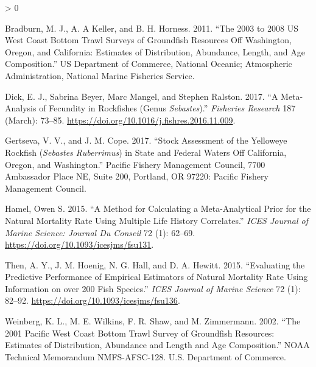 \documentclass[11pt,
  english,
  a4paper,
]{article}
\newlength{\cslhangindent}
\newenvironment{CSLReferences}[2] %
 {%
  \setlength{\parindent}{0pt}
  \ifodd #1 \everypar{\setlength{\hangindent}{\cslhangindent}}\ignorespaces\fi
  \ifnum #2 > 0
  \setlength{\parskip}{#2\baselineskip}
  \fi
 }%
 {}
\begin{document}
\hypertarget{refs}{}
\begin{CSLReferences}{1}{0}
\leavevmode\hypertarget{ref-bradburn_2003_2011}{}%
Bradburn, M. J., A. A Keller, and B. H. Horness. 2011. {``The 2003 to 2008 {US} {West} {Coast} Bottom Trawl Surveys of Groundfish Resources Off {Washington}, {Oregon}, and {California}: Estimates of Distribution, Abundance, Length, and Age Composition.''} US Department of Commerce, National Oceanic; Atmospheric Administration, National Marine Fisheries Service.

\leavevmode\hypertarget{ref-dick_meta-analysis_2017}{}%
Dick, E. J., Sabrina Beyer, Marc Mangel, and Stephen Ralston. 2017. {``A Meta-Analysis of Fecundity in Rockfishes (Genus \emph{Sebastes}).''} \emph{Fisheries Research} 187 (March): 73--85. \url{https://doi.org/10.1016/j.fishres.2016.11.009}.

\leavevmode\hypertarget{ref-gertseva_stock_2017}{}%
Gertseva, V. V., and J. M. Cope. 2017. {``Stock Assessment of the Yelloweye Rockfish (\emph{{Sebastes} Ruberrimus}) in State and {Federal} Waters Off {California}, {Oregon}, and {Washington}.''} Pacific Fishery Management Council, 7700 Ambassador Place NE, Suite 200, Portland, OR 97220: Pacific Fishery Management Council.

\leavevmode\hypertarget{ref-hamel_method_2015}{}%
Hamel, Owen S. 2015. {``A Method for Calculating a Meta-Analytical Prior for the Natural Mortality Rate Using Multiple Life History Correlates.''} \emph{ICES Journal of Marine Science: Journal Du Conseil} 72 (1): 62--69. \url{https://doi.org/10.1093/icesjms/fsu131}.

\leavevmode\hypertarget{ref-then_evaluating_2015-1}{}%
Then, A. Y., J. M. Hoenig, N. G. Hall, and D. A. Hewitt. 2015. {``Evaluating the Predictive Performance of Empirical Estimators of Natural Mortality Rate Using Information on over 200 Fish Species.''} \emph{ICES Journal of Marine Science} 72 (1): 82--92. \url{https://doi.org/10.1093/icesjms/fsu136}.

\leavevmode\hypertarget{ref-weinberg_2001_2002}{}%
Weinberg, K. L., M. E. Wilkins, F. R. Shaw, and M. Zimmermann. 2002. {``The 2001 {Pacific} {West} {Coast} Bottom Trawl Survey of Groundfish Resources: Estimates of Distribution, Abundance and Length and Age Composition.''} NOAA Technical Memorandum NMFS-AFSC-128. U.S. Department of Commerce.

\end{CSLReferences}

\leavevmode\tagmcend\tagstructend
\end{document}
